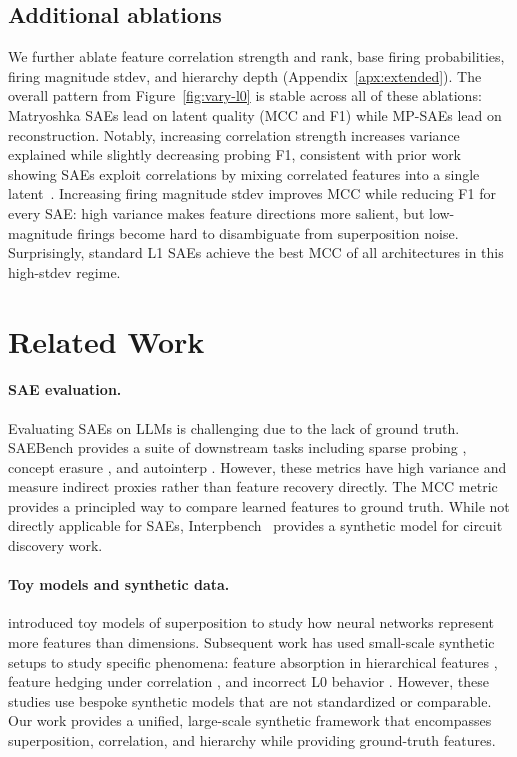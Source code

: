 \documentclass{article}
\theoremstyle{plain}
\theoremstyle{definition}
\theoremstyle{remark}
\begin{document}
\subsection{Additional ablations}
\label{sec:ablations}

We further ablate feature correlation strength and rank, base firing probabilities, firing magnitude stdev, and hierarchy depth (Appendix~\ref{apx:extended}). The overall pattern from Figure~\ref{fig:vary-l0} is stable across all of these ablations: Matryoshka SAEs lead on latent quality (MCC and F1) while MP-SAEs lead on reconstruction. Notably, increasing correlation strength increases variance explained while slightly decreasing probing F1, consistent with prior work showing SAEs exploit correlations by mixing correlated features into a single latent~\citep{chanin2025feature,chanin2025sparse}. Increasing firing magnitude stdev improves MCC while reducing F1 for every SAE: high variance makes feature directions more salient, but low-magnitude firings become hard to disambiguate from superposition noise. Surprisingly, standard L1 SAEs achieve the best MCC of all architectures in this high-stdev regime.

\section{Related Work}

\paragraph{SAE evaluation.} Evaluating SAEs on LLMs is challenging due to the lack of ground truth. SAEBench \citep{karvonen2025saebenchcomprehensivebenchmarksparse} provides a suite of downstream tasks including sparse probing \citep{gurnee2023finding}, concept erasure \citep{karvonen2024evaluating}, and autointerp \citep{paulo2025automatically}. However, these metrics have high variance and measure indirect proxies rather than feature recovery directly. The MCC metric \citep{oneill2025compute} provides a principled way to compare learned features to ground truth. While not directly applicable for SAEs, Interpbench~\cite{gupta2024interpbench} provides a synthetic model for circuit discovery work.

\paragraph{Toy models and synthetic data.} \citet{elhage2022toy} introduced toy models of superposition to study how neural networks represent more features than dimensions. Subsequent work has used small-scale synthetic setups to study specific phenomena: feature absorption in hierarchical features \citep{chanin2025a}, feature hedging under correlation \citep{chanin2025feature}, and incorrect L0 behavior \citep{chanin2025sparse}. However, these studies use bespoke synthetic models that are not standardized or comparable. Our work provides a unified, large-scale synthetic framework that encompasses superposition, correlation, and hierarchy while providing ground-truth features.
\end{document}
